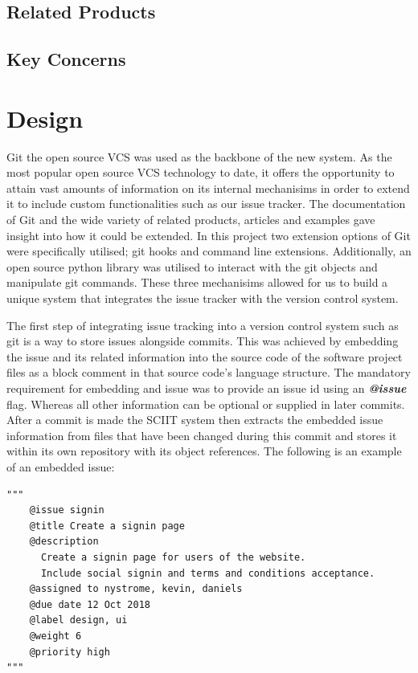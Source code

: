 \documentclass{mproj}
\newenvironment{code}{\captionsetup{type=listing}}{}
\begin{document}
\section{Related Products}

\section{Key Concerns}
\chapter{Design}\label{design}


Git the open source VCS was used as the backbone of the new system. As the most popular open source VCS  technology to date, it offers the opportunity to attain vast amounts of information on its internal mechanisims in order to extend it to include custom functionalities such as our issue tracker. The documentation of Git and the wide variety of related products, articles and examples gave insight into how it could be extended. In this project two extension options of Git were specifically utilised; git hooks and command line extensions. Additionally, an open source python library was utilised to interact with the git objects and manipulate git commands. These three mechanisims allowed for us to build a unique system that integrates the issue tracker with the version control system.


The first step of integrating issue tracking into a version control system such as git is a way to store issues alongside commits. This was achieved by embedding the issue and its related information into the source code of the software project files as a block comment in that source code's language structure. The mandatory requirement for embedding and issue was to provide an issue id using an \textbf{\textit{@issue}} flag. Whereas all other information can be optional or supplied in later commits. After a commit is made the SCIIT system then extracts the embedded issue information from files that have been changed during this commit and stores it within its own repository with its object references. The following is an example of an embedded issue:

\begin{code}
\begin{verbatim}
"""
    @issue signin
    @title Create a signin page
    @description
      Create a signin page for users of the website. 
      Include social signin and terms and conditions acceptance.
    @assigned to nystrome, kevin, daniels
    @due date 12 Oct 2018
    @label design, ui
    @weight 6
    @priority high    
"""
\end{verbatim}
\end{code}
\end{document}
